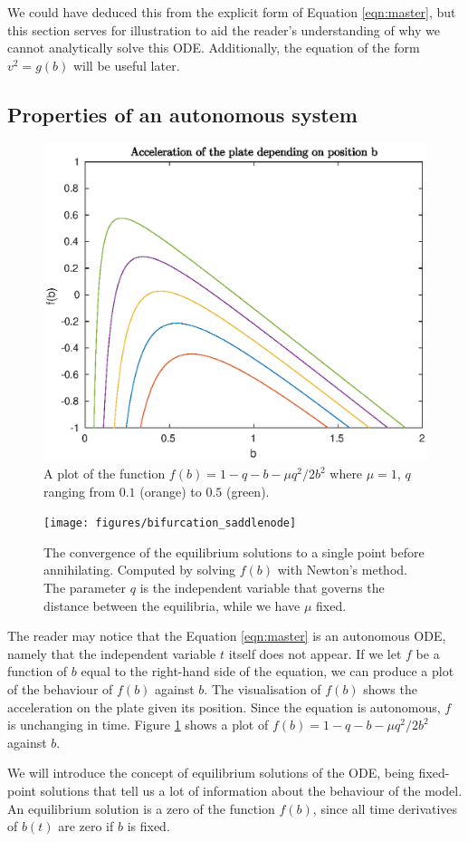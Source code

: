 We could have deduced this from the explicit form of Equation \ref{eqn:master},
but this section serves for illustration to aid the reader's understanding of why we cannot analytically solve this ODE.
Additionally, the equation of the form $v^2 = g(b)$ will be useful later.

\subsection{Properties of an autonomous system}

\begin{figure}[h!]
    \centering
    \includegraphics[width=0.5\linewidth]{figures/f_plot_mu_1_q_vary}
    \caption{A plot of the function $f(b) = 1-q-b-\mu q^2/2b^2$ where $\mu=1$, $q$ ranging from $0.1$ (orange) to $0.5$ (green).}
    \label{fig:acc_b_plot}
\end{figure}

\begin{figure}[h!]
	\centering
	\texttt{[image: figures/bifurcation\_saddlenode]}
	\caption{
		The convergence of the equilibrium solutions to a single point before annihilating. Computed by solving \(f(b)\) with Newton's method.
		The parameter \(q\) is the independent variable that governs the distance between the equilibria, while we have \(\mu\) fixed.
	}
	\label{fig:bifurcation}
\end{figure}
The reader may notice that the Equation \ref{eqn:master} is an autonomous ODE,
namely that the independent variable $t$ itself does not appear.
If we let $f$ be a function of $b$ equal to the right-hand side of the equation,
we can produce a plot of the behaviour of $f(b)$ against $b$.
The visualisation of $f(b)$ shows the acceleration on the plate given its position.
Since the equation is autonomous, $f$ is unchanging in time.
Figure \ref{fig:acc_b_plot} shows a plot of $f(b)= 1 - q - b - \mu q^2/2b^2$ against $b$.

We will introduce the concept of equilibrium solutions of the ODE,
being fixed-point solutions that tell us a lot of information about the behaviour of the model.
An equilibrium solution is a zero of the function \(f(b)\), since all time derivatives of \(b(t)\) are zero if \(b\) is fixed.

